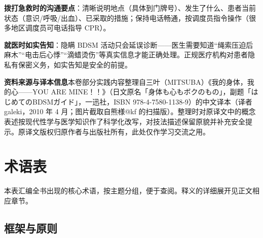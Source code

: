 \documentclass[12pt,UTF8]{ctexbook}
\begin{document}
\textbf{拨打急救时的沟通要点}：清晰说明地点（具体到门牌号）、发生了什么、患者当前状态（意识/呼吸/出血）、已采取的措施；保持电话畅通，按调度员指令操作（很多地区调度员可电话指导 CPR）。

\textbf{就医时如实告知}：隐瞒 BDSM 活动只会延误诊断——医生需要知道“绳索压迫后麻木”“电击后心悸”“滴蜡烫伤”等真实信息才能正确处理。正规医疗机构对患者隐私有保密义务，如实告知是安全的前提。

\vspace{1em}

\noindent\textbf{资料来源与译本信息}\quad 本卷部分实践内容整理自三叶（MITSUBA）《我的身体，我的心——YOU ARE MINE！！》（日文原名「身体も心もボクのもの」，副题「はじめてのBDSMガイド」，一迅社，ISBN 978-4-7580-1138-9）的中文译本（译者 galeki，2010 年 4 月；图片截取自熊様@kf 的扫描版）。整理时对原译文中的概念表述按现代性学与医学知识作了科学化改写，对技法描述保留原貌并补充安全提示。原译文版权归原作者与出版社所有，此处仅作学习交流之用。


\appendix

\chapter{术语表}\label{chap:glossary}

本表汇编全书出现的核心术语，按主题分组，便于查阅。释义的详细展开见正文相应章节。

\section{框架与原则}
\end{document}
